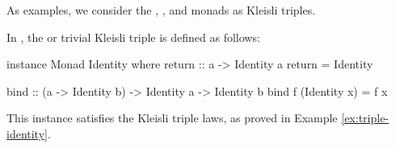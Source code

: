 As examples, we consider the ,
, and \texthaskell{[]} monads as Kleisli triples.

\begin{example}
  \label{ex:triple-identity-haskell}

  In \hask, the  or trivial Kleisli triple is
  defined as follows:
  \begin{codehaskell}
instance Monad Identity where
  return :: a -> Identity a
  return = Identity

  bind :: (a -> Identity b) -> Identity a -> Identity b
  bind f (Identity x) = f x
  \end{codehaskell}
  This instance satisfies the Kleisli triple laws, as proved in
  Example \ref{ex:triple-identity}.

\end{example}

